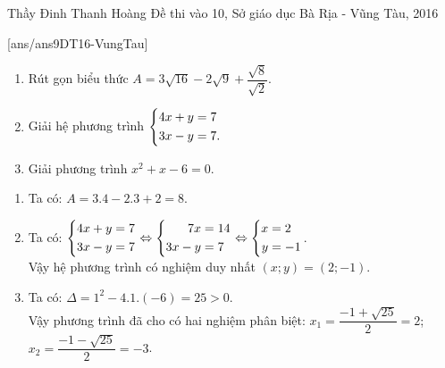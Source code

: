 \begin{name}
{Thầy  Đinh Thanh Hoàng}
{Đề thi vào 10, Sở giáo dục Bà Rịa - Vũng Tàu, 2016}
\end{name}
\setcounter{ex}{0}
[ans/ans9DT16-VungTau]
\begin{ex}%
    \hfill
    \begin{enumerate}
        \item Rút gọn biểu thức $A = 3\sqrt{16} - 2\sqrt{9}  + \dfrac{\sqrt{8}}{\sqrt{2}}$.
        \item Giải hệ phương trình $\left\{\begin{aligned}4x+y&=7\\ 3x-y&=7.\end{aligned}\right.$
        \item Giải phương trình $x^2 + x - 6 = 0$.
    \end{enumerate}
\loigiai
    {
    \begin{enumerate}
        \item Ta có: $A=3.4-2.3+2=8$.
        \item Ta có: $\left\{\begin{aligned}4x+y&=7\\ 3x-y&=7\end{aligned}\right. \Leftrightarrow \left\{\begin{aligned}7x&=14\\3x-y&=7\end{aligned}\right. \Leftrightarrow \left\{\begin{aligned}x&=2\\y&=-1\end{aligned}\right.$.\\
       	 		 Vậy hệ phương trình có nghiệm duy nhất $(x; y)=(2;-1)$.
       	 \item Ta có: $\Delta = 1^2-4.1.(-6)=25>0$.\\
				  Vậy phương trình đã cho có hai nghiệm phân biệt: $x_1=\dfrac{-1+\sqrt{25}}{2}=2$; $x_2=\dfrac{-1-\sqrt{25}}{2}=-3$.   	     \end{enumerate}
    }
\end{ex}

